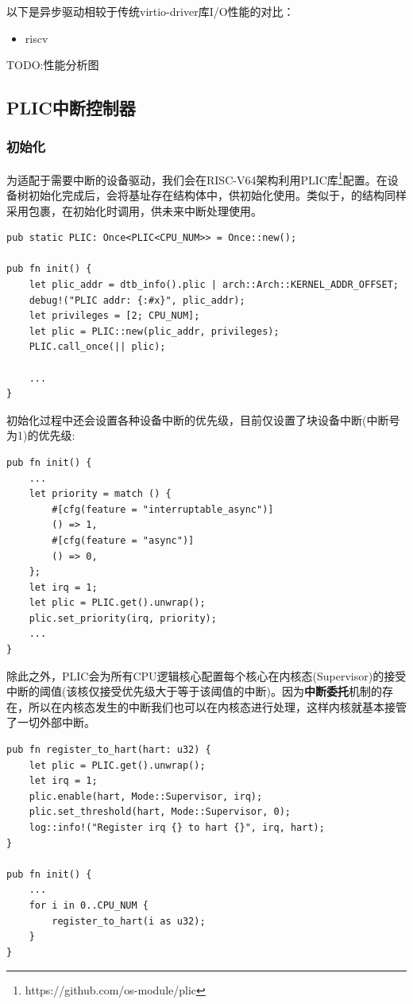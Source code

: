 \documentclass{article}
\begin{document}
以下是异步驱动相较于传统virtio-driver库I/O性能的对比：
\begin{itemize}
    \item riscv
\end{itemize}

TODO:性能分析图

\subsection{PLIC中断控制器}

\subsubsection{初始化}

为适配于需要中断的设备驱动，我们会在RISC-V64架构利用PLIC库\footnote{https://github.com/os-module/plic}配置。在设备树初始化完成后，会将基址存在结构体中，供初始化使用。类似于，的结构同样采用包裹，在初始化时调用，供未来中断处理使用。

\begin{lstlisting}
pub static PLIC: Once<PLIC<CPU_NUM>> = Once::new();

pub fn init() {
    let plic_addr = dtb_info().plic | arch::Arch::KERNEL_ADDR_OFFSET;
    debug!("PLIC addr: {:#x}", plic_addr);
    let privileges = [2; CPU_NUM];
    let plic = PLIC::new(plic_addr, privileges);
    PLIC.call_once(|| plic);

    ...
}
\end{lstlisting}

初始化过程中还会设置各种设备中断的优先级，目前仅设置了块设备中断(中断号为1)的优先级:

\begin{lstlisting}
pub fn init() {
    ...
    let priority = match () {
        #[cfg(feature = "interruptable_async")]
        () => 1,
        #[cfg(feature = "async")]
        () => 0,
    };
    let irq = 1;
    let plic = PLIC.get().unwrap();
    plic.set_priority(irq, priority);
    ...
}
\end{lstlisting}

除此之外，PLIC会为所有CPU逻辑核心配置每个核心在内核态(Supervisor)的接受中断的阈值(该核仅接受优先级大于等于该阈值的中断)。因为\textbf{中断委托}机制的存在，所以在内核态发生的中断我们也可以在内核态进行处理，这样内核就基本接管了一切外部中断。

\begin{lstlisting}
pub fn register_to_hart(hart: u32) {
    let plic = PLIC.get().unwrap();
    let irq = 1;
    plic.enable(hart, Mode::Supervisor, irq);
    plic.set_threshold(hart, Mode::Supervisor, 0);
    log::info!("Register irq {} to hart {}", irq, hart);
}

pub fn init() {
    ...
    for i in 0..CPU_NUM {
        register_to_hart(i as u32);
    }
}
\end{lstlisting}
\end{document}
